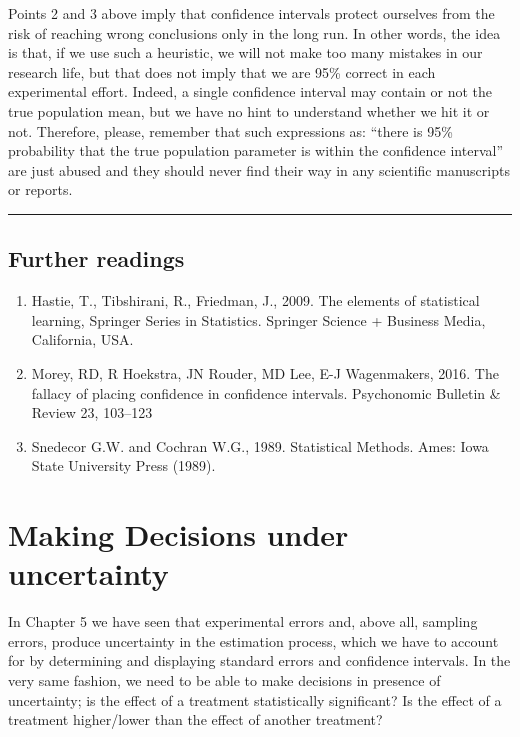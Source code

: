 \documentclass[a4paper,12pt,oneside]{book}
\providecommand{\tightlist}{%
  \setlength{\itemsep}{0pt}\setlength{\parskip}{0pt}}
\begin{document}
Points 2 and 3 above imply that confidence intervals protect ourselves from the risk of reaching wrong conclusions only in the long run. In other words, the idea is that, if we use such a heuristic, we will not make too many mistakes in our research life, but that does not imply that we are 95\% correct in each experimental effort. Indeed, a single confidence interval may contain or not the true population mean, but we have no hint to understand whether we hit it or not. Therefore, please, remember that such expressions as: ``there is 95\% probability that the true population parameter is within the confidence interval'' are just abused and they should never find their way in any scientific manuscripts or reports.

\begin{center}\rule{0.5\linewidth}{0.5pt}\end{center}

\hypertarget{further-readings-3}{%
\section{Further readings}\label{further-readings-3}}

\begin{enumerate}
\def\labelenumi{\arabic{enumi}.}
\tightlist
\item
  Hastie, T., Tibshirani, R., Friedman, J., 2009. The elements of statistical learning, Springer Series in Statistics. Springer Science + Business Media, California, USA.
\item
  Morey, RD, R Hoekstra, JN Rouder, MD Lee, E-J Wagenmakers, 2016. The fallacy of placing confidence in confidence intervals. Psychonomic Bulletin \& Review 23, 103--123
\item
  Snedecor G.W. and Cochran W.G., 1989. Statistical Methods. Ames: Iowa State University Press (1989).
\end{enumerate}

\hypertarget{making-decisions-under-uncertainty}{%
\chapter{Making Decisions under uncertainty}\label{making-decisions-under-uncertainty}}

In Chapter 5 we have seen that experimental errors and, above all, sampling errors, produce uncertainty in the estimation process, which we have to account for by determining and displaying standard errors and confidence intervals. In the very same fashion, we need to be able to make decisions in presence of uncertainty; is the effect of a treatment statistically significant? Is the effect of a treatment higher/lower than the effect of another treatment?
\end{document}
